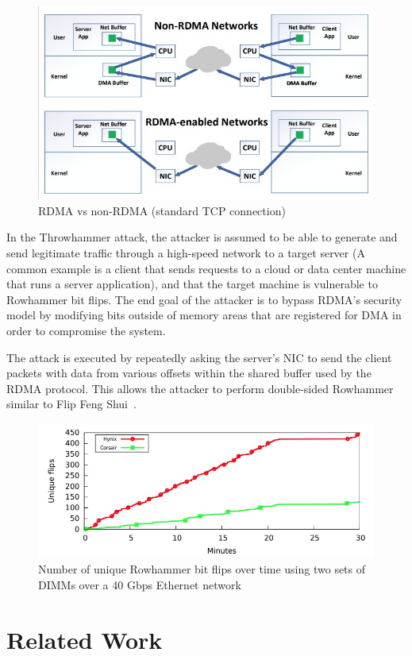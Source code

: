 \begin{figure}[!ht]
	\centering
	\includegraphics[width=0.8\linewidth]{images/chapter_9/RDMA.jpeg}
	\caption{RDMA vs non-RDMA (standard TCP connection)}
	\label{fig:RDMA_vs_non-RDMA}
\end{figure}

In the Throwhammer attack, the attacker is assumed to be able to generate and send legitimate
traffic through a high-speed network to a target server (A common example is a client that sends requests to a cloud or data center machine that runs a server application), and that the target machine is vulnerable to Rowhammer bit flips.
The end goal of the attacker is to bypass RDMA’s security model by modifying bits outside of memory areas that are registered for DMA in order to compromise the system.

The attack is executed by repeatedly asking the server’s NIC to send the client packets with data from various offsets within the shared buffer used by the RDMA protocol. This allows the attacker to perform double-sided Rowhammer similar to Flip Feng Shui~\cite{ffs}.

\begin{figure}[!ht]
	\centering
	\includegraphics[width=0.75\linewidth]{images/chapter_9/Unique-Flips.jpeg}
	\caption{Number of unique Rowhammer bit flips over time using two sets of DIMMs over a 40 Gbps Ethernet network ~\cite{throwhammer}}
	\label{fig:Unique-Flips}
\end{figure}


\section{Related Work} \label{sec:RelatedWork}

